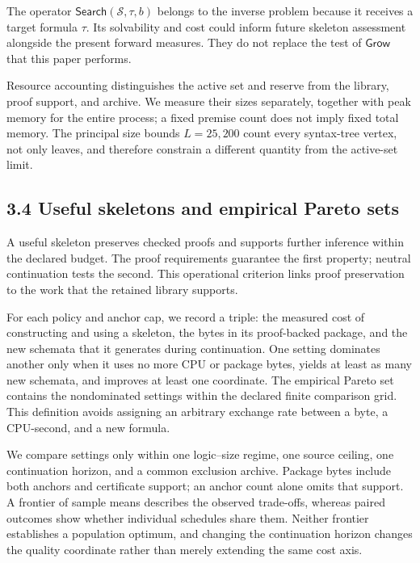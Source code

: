 \documentclass[pdflatex,sn-basic,Numbered]{sn-jnl}
\begin{document}
The operator \(\mathsf{S}\mathsf{e}\mathsf{a}\mathsf{r}\mathsf{c}\mathsf{h}(\mathcal{S},\tau,b)\) belongs to the inverse problem because it receives a target formula \(\tau\). Its solvability and cost could inform future skeleton assessment alongside the present forward measures. They do not replace the test of \(\mathsf{G}\mathsf{r}\mathsf{o}\mathsf{w}\) that this paper performs.

Resource accounting distinguishes the active set and reserve from the library, proof support, and archive. We measure their sizes separately, together with peak memory for the entire process; a fixed premise count does not imply fixed total memory. The principal size bounds \(L = 25,200\) count every syntax-tree vertex, not only leaves, and therefore constrain a different quantity from the active-set limit.

\subsection*{3.4 Useful skeletons and empirical Pareto sets}\label{useful-skeletons-and-empirical-pareto-sets}

A useful skeleton preserves checked proofs and supports further inference within the declared budget. The proof requirements guarantee the first property; neutral continuation tests the second. This operational criterion links proof preservation to the work that the retained library supports.

For each policy and anchor cap, we record a triple: the measured cost of constructing and using a skeleton, the bytes in its proof-backed package, and the new schemata that it generates during continuation. One setting dominates another only when it uses no more CPU or package bytes, yields at least as many new schemata, and improves at least one coordinate. The empirical Pareto set contains the nondominated settings within the declared finite comparison grid. This definition avoids assigning an arbitrary exchange rate between a byte, a CPU-second, and a new formula.

We compare settings only within one logic--size regime, one source ceiling, one continuation horizon, and a common exclusion archive. Package bytes include both anchors and certificate support; an anchor count alone omits that support. A frontier of sample means describes the observed trade-offs, whereas paired outcomes show whether individual schedules share them. Neither frontier establishes a population optimum, and changing the continuation horizon changes the quality coordinate rather than merely extending the same cost axis.
\end{document}
